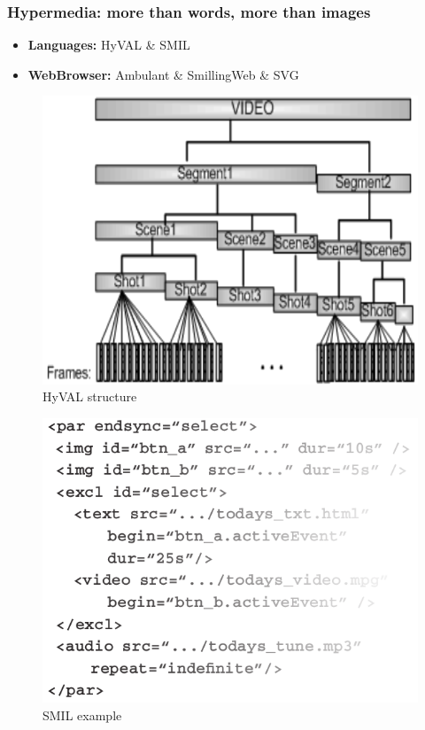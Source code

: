 \documentclass[compress]{beamer}
\begin{document}
\begin{frame}[c]
\begin{figure}
		\end{figure}
		\end{frame}


		\begin{frame}[c]
		\frametitle{Hypermedia: more than words, more than images}
		\begin{itemize}		
		\item \textbf{Languages:} HyVAL \& SMIL
		\vfill
		\item \textbf{WebBrowser:} Ambulant \& SmillingWeb \& SVG
		\end{itemize}
		
		\begin{multicols}{2}
		\begin{figure}
			\includegraphics[height=0.4\textheight]{figures/hyval.png}
			\caption{HyVAL structure}
		\end{figure}
		\begin{figure}
			\includegraphics[height=0.4\textheight]{figures/smil.png}
			\caption{SMIL example}
		\end{figure}
		\end{multicols}
		\end{frame}
\end{document}
